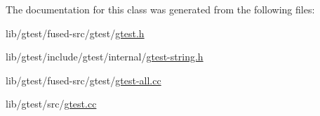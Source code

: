 The documentation for this class was generated from the following files\-:\begin{DoxyCompactItemize}
\item 
lib/gtest/fused-\/src/gtest/\hyperlink{fused-src_2gtest_2gtest_8h}{gtest.\-h}\item 
lib/gtest/include/gtest/internal/\hyperlink{gtest-string_8h}{gtest-\/string.\-h}\item 
lib/gtest/fused-\/src/gtest/\hyperlink{fused-src_2gtest_2gtest-all_8cc}{gtest-\/all.\-cc}\item 
lib/gtest/src/\hyperlink{gtest_8cc}{gtest.\-cc}\end{DoxyCompactItemize}
